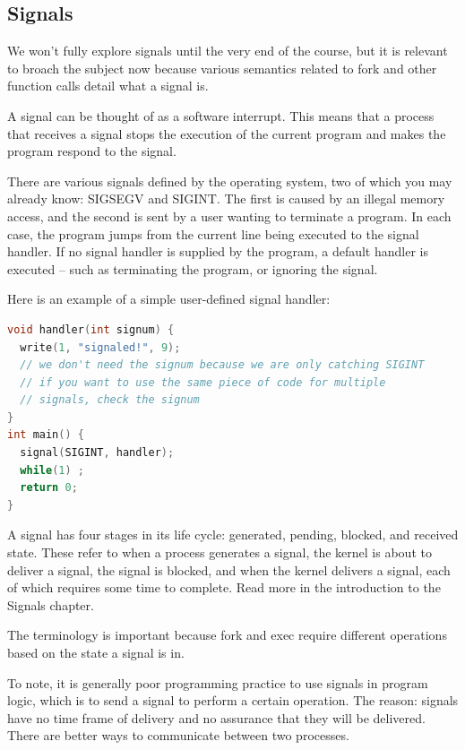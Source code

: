 \subsection{Signals}

We won't fully explore signals until the very end of the course, but it is relevant to broach the subject now because various semantics related to fork and other function calls detail what a signal is.

A signal can be thought of as a software interrupt. This means that a process that receives a signal stops the execution of the current program and makes the program respond to the signal.

There are various signals defined by the operating system, two of which you may already know: SIGSEGV and SIGINT.
The first is caused by an illegal memory access, and the second is sent by a user wanting to terminate a program.
In each case, the program jumps from the current line being executed to the signal handler.
If no signal handler is supplied by the program, a default handler is executed -- such as terminating the program, or ignoring the signal.

Here is an example of a simple user-defined signal handler:

\begin{lstlisting}[language=C]
void handler(int signum) {
  write(1, "signaled!", 9);
  // we don't need the signum because we are only catching SIGINT
  // if you want to use the same piece of code for multiple
  // signals, check the signum
}
int main() {
  signal(SIGINT, handler);
  while(1) ;
  return 0;
}
\end{lstlisting}

A signal has four stages in its life cycle: generated, pending, blocked, and received state.
These refer to when a process generates a signal, the kernel is about to deliver a signal, the signal is blocked, and when the kernel delivers a signal, each of which requires some time to complete.
Read more in the introduction to the Signals chapter.

The terminology is important because fork and exec require different operations based on the state a signal is in.

To note, it is generally poor programming practice to use signals in program logic, which is to send a signal to perform a certain operation.
The reason: signals have no time frame of delivery and no assurance that they will be delivered.
There are better ways to communicate between two processes.

